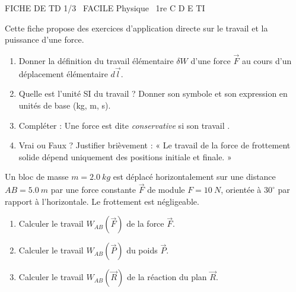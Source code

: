 \documentclass[11pt]{article}
\begin{document}
\begin{tcolorbox}[enhanced,colback=popink,colframe=popink,arc=10pt,boxrule=0pt,left=12pt,right=12pt,top=9pt,bottom=9pt]
{\color{white}\popxbold\small FICHE DE TD 1/3 \textbullet\ FACILE \hfill Physique \textbullet\ 1re C D E TI\par}
\end{tcolorbox}
\vspace{4pt}
Cette fiche propose des exercices d'application directe sur le travail et la puissance d'une force.

\begin{exercice}
\begin{enumerate}
    \item Donner la définition du travail élémentaire $\delta W$ d'une force $\vec{F}$ au cours d'un déplacement élémentaire $d\vec{l}$.
    \item Quelle est l'unité SI du travail ? Donner son symbole et son expression en unités de base (kg, m, s).
    \item Compléter : Une force est dite \textit{conservative} si son travail \underline{\hspace{5cm}}.
    \item Vrai ou Faux ? Justifier brièvement : « Le travail de la force de frottement solide dépend uniquement des positions initiale et finale. »
\end{enumerate}
\end{exercice}

\begin{exercice}
Un bloc de masse $m = \SI{2,0}{kg}$ est déplacé horizontalement sur une distance $AB = \SI{5,0}{m}$ par une force constante $\vec{F}$ de module $F = \SI{10}{N}$, orientée à $30^\circ$ par rapport à l'horizontale. Le frottement est négligeable.
\begin{enumerate}
    \item Calculer le travail $W_{AB}(\vec{F})$ de la force $\vec{F}$.
    \item Calculer le travail $W_{AB}(\vec{P})$ du poids $\vec{P}$.
    \item Calculer le travail $W_{AB}(\vec{R})$ de la réaction du plan $\vec{R}$.
\end{enumerate}
\end{exercice}
\end{document}

